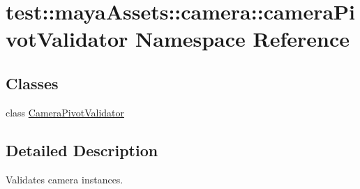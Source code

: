\hypertarget{namespacetest_1_1mayaAssets_1_1camera_1_1cameraPivotValidator}{\section{test\-:\-:maya\-Assets\-:\-:camera\-:\-:camera\-Pivot\-Validator \-Namespace \-Reference}
\label{dd/d79/namespacetest_1_1mayaAssets_1_1camera_1_1cameraPivotValidator}
}
\subsection*{\-Classes}
\begin{DoxyCompactItemize}
\item 
class \hyperlink{classtest_1_1mayaAssets_1_1camera_1_1cameraPivotValidator_1_1CameraPivotValidator}{\-Camera\-Pivot\-Validator}
\end{DoxyCompactItemize}


\subsection{\-Detailed \-Description}
\begin{DoxyVerb}
Validates camera instances.
\end{DoxyVerb}
 